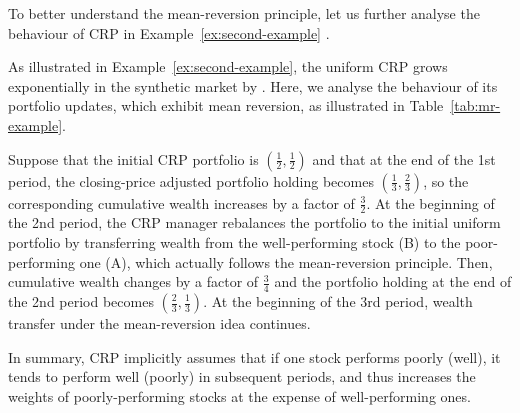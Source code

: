 To better understand the mean-reversion principle, let us further analyse the behaviour of CRP in Example~\ref{ex:second-example} \citep{pamr}.
\begin{example}
As illustrated in Example~\ref{ex:second-example}, the uniform CRP grows exponentially in the synthetic market by \citet{cover-gluss86}. Here, we analyse the behaviour of its portfolio updates, which exhibit mean reversion, as illustrated in Table~\ref{tab:mr-example}.
\begin{table}[H]
\caption{Example illustrating the mean-reversion trading idea.}
\label{tab:mr-example}
\centering
{}
\end{table}
Suppose that the initial CRP portfolio is $(\frac{1}{2}, \frac{1}{2})$ and that at the end of the 1st period, the closing-price adjusted portfolio holding becomes $(\frac{1}{3}, \frac{2}{3})$, so the corresponding cumulative wealth increases by a factor of $\frac{3}{2}$. At the beginning of the 2nd period, the CRP manager rebalances the portfolio to the initial uniform portfolio by transferring wealth from the well-performing stock (B) to the poor-performing one (A), which actually follows the mean-reversion principle. Then, cumulative wealth changes by a factor of $\frac{3}{4}$ and the portfolio holding at the end of the 2nd period becomes $(\frac{2}{3}, \frac{1}{3})$. At the beginning of the 3rd period, wealth transfer under the mean-reversion idea continues.

In summary, CRP implicitly assumes that if one stock performs poorly (well), it tends to perform well (poorly) in subsequent periods, and thus increases the weights of poorly-performing stocks at the expense of well-performing ones.

\end{example}


